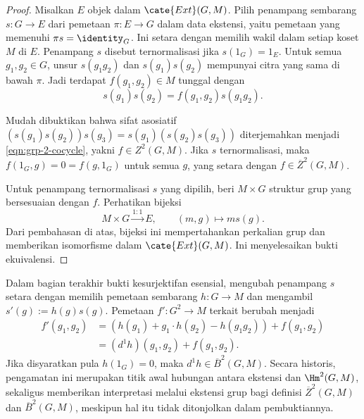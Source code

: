 \begin{proof}
	Misalkan $E$ objek dalam $\cate{Ext}(G,M)$. Pilih penampang sembarang
	$s:G\to E$ dari pemetaan $\pi:E\to G$ dalam data ekstensi, yaitu pemetaan
	yang memenuhi $\pi s=\identity_G$. Ini setara dengan memilih wakil dalam
	setiap koset $M$ di $E$. Penampang $s$ disebut ternormalisasi jika
	$s(1_G)=1_E$. Untuk semua $g_1,g_2\in G$, unsur $s(g_1g_2)$ dan
	$s(g_1)s(g_2)$ mempunyai citra yang sama di bawah $\pi$. Jadi terdapat
	$f(g_1,g_2)\in M$ tunggal dengan
	\[ s(g_1)s(g_2)=f(g_1,g_2)s(g_1g_2). \]

	Mudah dibuktikan bahwa sifat asosiatif
	$(s(g_1)s(g_2))s(g_3)=s(g_1)(s(g_2)s(g_3))$ diterjemahkan menjadi
	\eqref{eqn:grp-2-cocycle}, yakni $f\in Z^2(G,M)$. Jika $s$ ternormalisasi,
	maka $f(1_G,g)=0=f(g,1_G)$ untuk semua $g$, yang setara dengan
	$f\in\overline{Z}^2(G,M)$.

	Untuk penampang ternormalisasi $s$ yang dipilih, beri $M\times G$ struktur
	grup yang bersesuaian dengan $f$. Perhatikan bijeksi
	\[ M\times G\xrightarrow{1:1}E,\qquad(m,g)\mapsto ms(g). \]
	Dari pembahasan di atas, bijeksi ini mempertahankan perkalian grup dan
	memberikan isomorfisme dalam $\cate{Ext}(G,M)$. Ini menyelesaikan bukti
	ekuivalensi.
\end{proof}

Dalam bagian terakhir bukti kesurjektifan esensial, mengubah penampang $s$
setara dengan memilih pemetaan sembarang $h:G\to M$ dan mengambil
$s'(g):=h(g)s(g)$. Pemetaan $f':G^2\to M$ terkait berubah menjadi
\begin{align*}
	f'(g_1,g_2)&=\left(h(g_1)+g_1\cdot h(g_2)-h(g_1g_2)\right)+f(g_1,g_2)\\
	&=(d^1h)(g_1,g_2)+f(g_1,g_2).
\end{align*}
Jika disyaratkan pula $h(1_G)=0$, maka
$d^1h\in\overline{B}^2(G,M)$. Secara historis, pengamatan ini
merupakan titik awal hubungan antara ekstensi dan $\Hm^2(G,M)$, sekaligus
memberikan interpretasi melalui ekstensi grup bagi definisi
$\overline{Z}^2(G,M)$ dan $\overline{B}^2(G,M)$, meskipun hal itu tidak
ditonjolkan dalam pembuktiannya.

